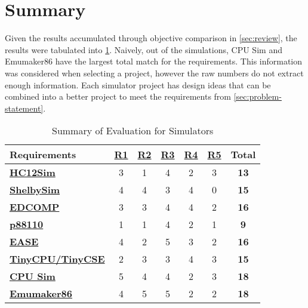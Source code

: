 \section{Summary}

Given the results accumulated through objective comparison in \cref{sec:review}, the results were tabulated into \cref{table:simulator-evaluation-summary}. Naively, out of the simulations, CPU Sim\cite{Skrien2001,Skrien2017} and Emumaker86\cite{Black2013} have the largest total match for the requirements. This information was considered when selecting a project, however the raw numbers do not extract enough information. Each simulator project has design ideas that can be combined into a better project to meet the requirements from \cref{sec:problem-statement}. 

\begin{table}[h!]
    \centering
    \begin{tabular}{lcccccc}
        \textbf{Requirements} & \textbf{\hyperref[req:personal]{R1}} & \textbf{\hyperref[req:configuration]{R2}} & \textbf{\hyperref[req:pedagogical]{R3}} & \textbf{\hyperref[req:simulations]{R4}} & \textbf{\hyperref[req:modern]{R5}} & \textbf{Total} \\ \hline
        
        \textbf{\hyperref[sec:review-prev-hc12sim]{HC12Sim} \cite{Brightwell2013}} 
        & 3 & 1 & 4 & 2 & 3 & \textbf{13} \\
        \textbf{\hyperref[sec:review-shelbysim]{ShelbySim} \cite{Tappan2009, Tappan2009-2}} 
        & 4 & 4 & 3 & 4 & 0 & \textbf{15} \\
        \textbf{\hyperref[sec:review-edcomp]{EDCOMP} \cite{Djordjevic2005}}
        & 3 & 3 & 4 & 4 & 2 & \textbf{16} \\
        \textbf{\hyperref[sec:review-p88110]{p88110} \cite{Garcia2009}}
        & 1 & 1 & 4 & 2 & 1 & \textbf{9}  \\
        \textbf{\hyperref[sec:review-ease]{EASE} \cite{Skillen2011}}
        & 4 & 2 & 5 & 3 & 2 & \textbf{16} \\
        \textbf{\hyperref[sec:review-tiny-cse]{TinyCPU/TinyCSE} \cite{Nakamura2013,McLoughlin2010}} 
        & 2 & 3 & 3 & 4 & 3 & \textbf{15} \\
        \textbf{\hyperref[sec:review-cpu-sim]{CPU Sim} \cite{Skrien2001, Skrien2017}}
        & 5 & 4 & 4 & 2 & 3 & \textbf{18} \\
        \textbf{\hyperref[sec:review-emumaker86]{Emumaker86} \cite{Black2013}} 
        & 4 & 5 & 5 & 2 & 2 & \textbf{18} \\ 
    \end{tabular}
    \caption{Summary of Evaluation for Simulators}
    \label{table:simulator-evaluation-summary}
\end{table}

